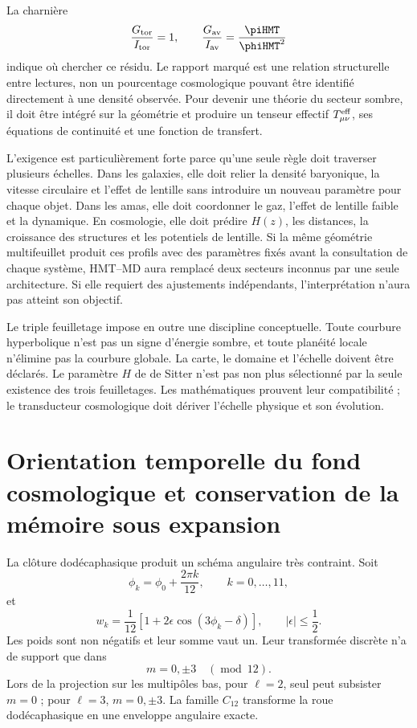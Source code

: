 La charnière
\[
 \frac{G_{\rm tor}}{I_{\rm tor}}=1,
 \qquad
 \frac{G_{\rm av}}{I_{\rm av}}
 =
 \frac{\piHMT}{\phiHMT^2}
\]
indique où chercher ce résidu. Le rapport marqué est une relation structurelle entre
lectures, non un pourcentage cosmologique pouvant être identifié directement à une
densité observée. Pour devenir une théorie du secteur sombre, il doit être intégré
sur la géométrie et produire un tenseur effectif
\(T^{\rm eff}_{\mu\nu}\), ses équations de continuité et une fonction de
transfert.

L'exigence est particulièrement forte parce qu'une seule règle doit traverser plusieurs
échelles. Dans les galaxies, elle doit relier la densité baryonique, la vitesse circulaire et l'effet de lentille
sans introduire un nouveau paramètre pour chaque objet. Dans les amas, elle doit coordonner le gaz,
l'effet de lentille faible et la dynamique. En cosmologie, elle doit prédire \(H(z)\), les distances,
la croissance des structures et les potentiels de lentille. Si la même géométrie multifeuillet
produit ces profils avec des paramètres fixés avant la consultation de chaque système,
HMT--MD aura remplacé deux secteurs inconnus par une seule architecture. Si
elle requiert des ajustements indépendants, l'interprétation n'aura pas atteint son objectif.

Le triple feuilletage impose en outre une discipline conceptuelle. Toute courbure
hyperbolique n'est pas un signe d'énergie sombre, et toute planéité locale n'élimine pas la
courbure globale. La carte, le domaine et l'échelle doivent être déclarés. Le paramètre
\(H\) de de Sitter n'est pas non plus sélectionné par la seule existence des trois
feuilletages. Les mathématiques prouvent leur compatibilité ; le transducteur cosmologique doit
dériver l'échelle physique et son évolution.

\section{Orientation temporelle du fond cosmologique et conservation de la mémoire sous expansion}

La clôture dodécaphasique produit un schéma angulaire très contraint. Soit
\[
 \phi_k=\phi_0+\frac{2\pi k}{12},
 \qquad k=0,\ldots,11,
\]
et
\[
 w_k
 =
 \frac1{12}
 \left[
 1+2\epsilon\cos(3\phi_k-\delta)
 \right],
 \qquad
 |\epsilon|\leq\frac12.
\]
Les poids sont non négatifs et leur somme vaut un. Leur transformée discrète n'a de support que
dans
\[
  m=0,\pm3\quad(\operatorname{mod}\ 12).
\]
Lors de la projection sur les multipôles bas, pour \(\ell=2\), seul peut subsister
\(m=0\) ; pour \(\ell=3\), \(m=0,\pm3\). La famille \(C_{12}\) transforme la roue
dodécaphasique en une enveloppe angulaire exacte.

